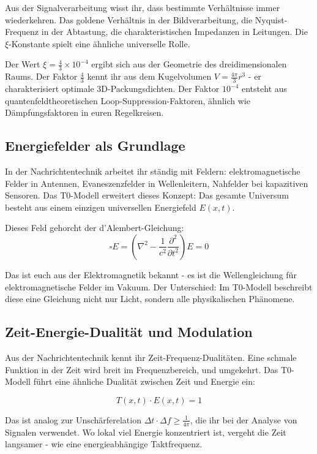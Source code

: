 \documentclass[12pt,a4paper]{article}
\begin{document}
Aus der Signalverarbeitung wisst ihr, dass bestimmte Verhältnisse immer wiederkehren. Das goldene Verhältnis in der Bildverarbeitung, die Nyquist-Frequenz in der Abtastung, die charakteristischen Impedanzen in Leitungen. Die $\xi$-Konstante spielt eine ähnliche universelle Rolle.

Der Wert $\xi = \frac{4}{3} \times 10^{-4}$ ergibt sich aus der Geometrie des dreidimensionalen Raums. Der Faktor $\frac{4}{3}$ kennt ihr aus dem Kugelvolumen $V = \frac{4\pi}{3}r^3$ - er charakterisiert optimale 3D-Packungsdichten. Der Faktor $10^{-4}$ entsteht aus quantenfeldtheoretischen Loop-Suppression-Faktoren, ähnlich wie Dämpfungsfaktoren in euren Regelkreisen.

\subsection{Energiefelder als Grundlage}

In der Nachrichtentechnik arbeitet ihr ständig mit Feldern: elektromagnetische Felder in Antennen, Evaneszenzfelder in Wellenleitern, Nahfelder bei kapazitiven Sensoren. Das T0-Modell erweitert dieses Konzept: Das gesamte Universum besteht aus einem einzigen universellen Energiefeld $E(x,t)$.

Dieses Feld gehorcht der d'Alembert-Gleichung:
$$\square E = \left(\nabla^2 - \frac{1}{c^2}\frac{\partial^2}{\partial t^2}\right) E = 0$$

Das ist euch aus der Elektromagnetik bekannt - es ist die Wellengleichung für elektromagnetische Felder im Vakuum. Der Unterschied: Im T0-Modell beschreibt diese eine Gleichung nicht nur Licht, sondern alle physikalischen Phänomene.

\subsection{Zeit-Energie-Dualität und Modulation}

Aus der Nachrichtentechnik kennt ihr Zeit-Frequenz-Dualitäten. Eine schmale Funktion in der Zeit wird breit im Frequenzbereich, und umgekehrt. Das T0-Modell führt eine ähnliche Dualität zwischen Zeit und Energie ein:

$$T(x,t) \cdot E(x,t) = 1$$

Das ist analog zur Unschärferelation $\Delta t \cdot \Delta f \geq \frac{1}{4\pi}$, die ihr bei der Analyse von Signalen verwendet. Wo lokal viel Energie konzentriert ist, vergeht die Zeit langsamer - wie eine energieabhängige Taktfrequenz.
\end{document}
